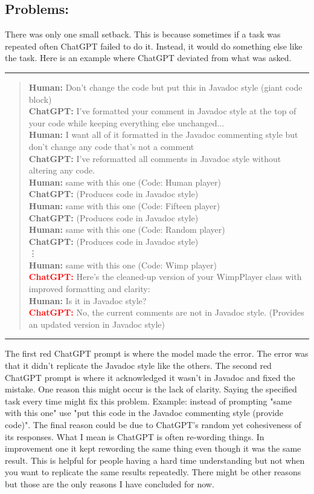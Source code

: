 \documentclass[a4paper,11pt]{article}
\begin{document}
\subsection*{Problems:}
There was only one small setback. This is because sometimes if a task was repeated often ChatGPT failed to do it. Instead, it would do something else like the task. Here is an example where ChatGPT deviated from what was asked.\\
\hrule
\vspace{4pt} %
\begin{quote}
\textbf{Human:} Don't change the code but put this in Javadoc style (giant code block) \\
\textbf{ChatGPT:} I've formatted your comment in Javadoc style at the top of your code while keeping everything else unchanged... \\
\textbf{Human:} I want all of it formatted in the Javadoc commenting style but don't change any code that's not a comment\\
\textbf{ChatGPT:} I've reformatted all comments in Javadoc style without altering any code. \\
\textbf{Human:} same with this one (Code: Human player)\\
\textbf{ChatGPT:} (Produces code in Javadoc style)\\ 
\textbf{Human:} same with this one (Code: Fifteen player)\\
\textbf{ChatGPT:} (Produces code in Javadoc style)\\ 
\textbf{Human:} same with this one (Code: Random player)\\
\textbf{ChatGPT:} (Produces code in Javadoc style)\\ 
\vdots\\
\textbf{Human:} same with this one (Code: Wimp player)\\
\textcolor{red}{\textbf{ChatGPT:}} Here’s the cleaned-up version of your WimpPlayer class with improved formatting and clarity:\\
\textbf{Human:} Is it in Javadoc style?\\
\textcolor{red}{\textbf{ChatGPT:}} No, the current comments are not in Javadoc style. (Provides an updated version in Javadoc style)
\end{quote}
\hrule
\vspace{13pt} %
The first red ChatGPT prompt is where the model made the error. The error was that it didn't replicate the Javadoc style like the others. The second red ChatGPT prompt is where it acknowledged it wasn't in Javadoc and fixed the mistake. One reason this might occur is the lack of clarity. Saying the specified task every time might fix this problem. Example: instead of prompting "same with this one" use "put this code in the Javadoc commenting style (provide code)". The final reason could be due to ChatGPT's random yet cohesiveness of its responses. What I mean is ChatGPT is often re-wording things. In improvement one it kept rewording the same thing even though it was the same result. This is helpful for people having a hard time understanding but not when you want to replicate the same results repeatedly. There might be other reasons but those are the only reasons I have concluded for now.
\end{document}
